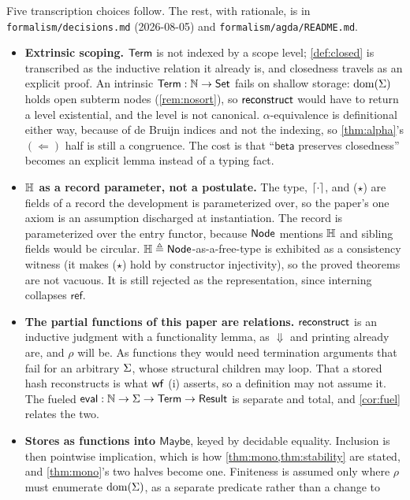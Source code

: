 \documentclass[11pt]{article}
\theoremstyle{definition}
\theoremstyle{plain}
\theoremstyle{remark}
\begin{document}
Five transcription choices follow. The rest, with rationale, is in
\texttt{formalism/decisions.md} (2026-08-05) and \texttt{formalism/agda/README.md}.
\begin{itemize}[nosep]
  \item \textbf{Extrinsic scoping.} $\mathsf{Term}$ is not indexed by a scope level;
  \cref{def:closed} is transcribed as the inductive relation it already is, and closedness
  travels as an explicit proof. An intrinsic $\mathsf{Term} : \mathbb{N} \to \mathsf{Set}$ fails on
  shallow storage: $\operatorname{dom}(\Sigma)$ holds open subterm nodes (\cref{rem:nosort}), so
  $\mathsf{reconstruct}$ would have to return a level existential, and the level is not canonical.
  $\alpha$-equivalence is definitional either way, because of de Bruijn indices and not the
  indexing, so \cref{thm:alpha}'s $(\Leftarrow)$ half is still a congruence. The cost is that
  ``$\mathsf{beta}$ preserves closedness'' becomes an explicit lemma instead of a typing fact.
  \item \textbf{$\mathbb{H}$ as a record parameter, not a postulate.} The type, $\lceil \cdot \rceil$, and
  ($\star$) are fields of a record the development is parameterized over, so the paper's one
  axiom is an assumption discharged at instantiation. The record is parameterized over the
  entry functor, because $\mathsf{Node}$ mentions $\mathbb{H}$ and sibling fields would be circular.
  $\mathbb{H} \triangleq \mathsf{Node}$-as-a-free-type is exhibited as a consistency witness (it makes ($\star$)
  hold by constructor injectivity), so the proved theorems are not vacuous. It is still
  rejected as the representation, since interning collapses $\mathsf{ref}$.
  \item \textbf{The partial functions of this paper are relations.} $\mathsf{reconstruct}$ is an
  inductive judgment with a functionality lemma, as $\Downarrow$ and printing already are, and
  $\rho$ will be. As functions they would need termination arguments that fail for an
  arbitrary $\Sigma$, whose structural children may loop. That a stored hash reconstructs is
  what $\mathsf{wf}$ (i) asserts, so a definition may not assume it. The fueled
  $\mathsf{eval} : \mathbb{N} \to \Sigma \to \mathsf{Term} \to \mathsf{Result}$ is separate and total,
  and \cref{cor:fuel} relates the two.
  \item \textbf{Stores as functions into $\mathsf{Maybe}$}, keyed by decidable equality.
  Inclusion is then pointwise implication, which is how \cref{thm:mono,thm:stability} are
  stated, and \cref{thm:mono}'s two halves become one. Finiteness is assumed only where
  $\rho$ must enumerate $\operatorname{dom}(\Sigma)$, as a separate predicate rather than a change to

\end{itemize}
\end{document}
